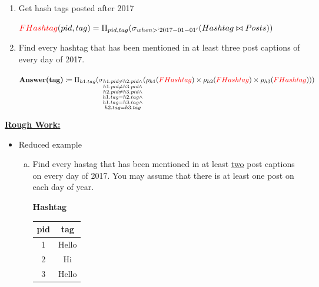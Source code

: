 \documentclass[12pt]{article}
\begin{document}
\begin{enumerate}[1.]
\begin{mdframed}
        \bigskip

        \begin{enumerate}[1.]
            \item Get hash tags posted after 2017

            \bigskip

            $\color{red}\color{red}FHashtag\color{black}(pid, tag) = \Pi_{pid,tag}(\sigma_{when > `2017-01-01'}(Hashtag \bowtie Posts))$

            \bigskip

            \item Find every hashtag that has been mentioned in at least three post
            captions of every day of 2017.

            \bigskip

            $\textbf{Answer(tag)} \coloneqq \\ \Pi_{h1.tag}(\sigma_{\substack{h1.pid \neq h2.pid \land
            \\ h1.pid \neq h3.pid \land \\ h2.pid \neq h3.pid \land \\ h1.tag = h2.tag \land \\ h1.tag = h3.tag \land \\ h2.tag = h3.tag}} (\rho_{h1}(\color{red}FHashtag\color{black}) \times \rho_{h2}(\color{red}FHashtag\color{black}) \times \rho_{h3}(\color{red}FHashtag\color{black})))$
        \end{enumerate}
    \end{mdframed}

    \underline{\textbf{Rough Work:}}

    \bigskip

    \begin{itemize}
        \item Reduced example
        \begin{enumerate} [a)]
            \item Find every hastag that has been mentioned in at least \underline{two}
            post captions on every day of 2017. You may assume that there is at least
            one post on each day of year.

            \bigskip

            \textbf{Hashtag}

            \bigskip

            \begin{tabular}{|c|c|}
                \hline
                pid & tag\\
                \hline
                1   &   Hello\\
                \hline
                2   &   Hi\\
                \hline
                3   &   Hello\\
                \hline
            \end{tabular}


\end{enumerate}
\end{itemize}
\end{enumerate}
\end{document}
